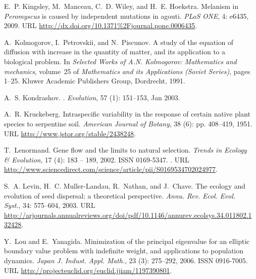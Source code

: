 \documentclass[10pt,letterpaper]{article}
\begin{document}
\begin{thebibliography}{68}
E.~P. Kingsley, M.~Manceau, C.~D. Wiley, and H.~E. Hoekstra.
\newblock Melanism in \textit{{Peromyscus}} is caused by independent mutations
  in agouti.
\newblock \emph{PLoS ONE}, 4: e6435, 2009.
\newblock URL \url{http://dx.doi.org/10.1371%2Fjournal.pone.0006435}.

A.~Kolmogorov, I.~Petrovskii, and N.~Piscunov.
\newblock A study of the equation of diffusion with increase in the quantity of
  matter, and its application to a biological problem.
\newblock In \emph{Selected Works of A.N. Kolmogorov: Mathematics and
  mechanics}, volume~25 of \emph{Mathematics and its Applications (Soviet
  Series)}, pages 1--25. Kluwer Academic Publishers Group, Dordrecht, 1991.

A.~S. Kondrashov.
.
\newblock \emph{Evolution}, 57 (1): 151--153, Jan 2003.

A.~R. Kruckeberg.
\newblock Intraspecific variability in the response of certain native plant
  species to serpentine soil.
\newblock \emph{American Journal of Botany}, 38 (6): pp.
  408--419, 1951.
\newblock URL \url{http://www.jstor.org/stable/2438248}.

T.~Lenormand.
\newblock Gene flow and the limits to natural selection.
\newblock \emph{Trends in Ecology \& Evolution}, 17 (4): 183
  -- 189, 2002.
\newblock ISSN 0169-5347.
\newblock {}.
\newblock URL
  \url{http://www.sciencedirect.com/science/article/pii/S0169534702024977}.

S.~A. Levin, H.~C. Muller-Landau, R.~Nathan, and J.~Chave.
\newblock The ecology and evolution of seed dispersal: a theoretical
  perspective.
\newblock \emph{Annu. Rev. Ecol. Evol. Syst.}, 34: 575--604, 2003.
\newblock URL
  \url{http://arjournals.annualreviews.org/doi/pdf/10.1146/annurev.ecolsys.34.011802.132428}.

Y.~Lou and E.~Yanagida.
\newblock Minimization of the principal eigenvalue for an elliptic boundary
  value problem with indefinite weight, and applications to population
  dynamics.
\newblock \emph{Japan J. Indust. Appl. Math.}, 23 (3):
  275--292, 2006.
\newblock ISSN 0916-7005.
\newblock URL \url{http://projecteuclid.org/euclid.jjiam/1197390801}.


\end{thebibliography}
\end{document}
